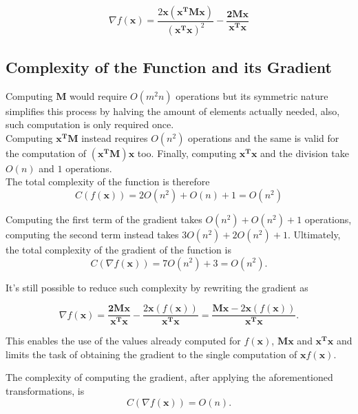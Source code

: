 \documentclass{article}
\numberwithin{equation}{section}
\begin{document}
\begin{equation}
    \nabla f(\boldsymbol{x})= \frac{2 \boldsymbol{x}( \boldsymbol{x^T M x})}{(\boldsymbol{x^Tx})^2} - \frac{ \boldsymbol{2Mx}}{ \boldsymbol{x^Tx}}
\end{equation}

\subsection{Complexity of the Function and its Gradient}

Computing $\boldsymbol{M}$ would require $O(m^2n)$ operations but its symmetric nature simplifies this process by halving the amount of elements actually needed, also, such computation is only required once. \\

Computing $\boldsymbol{x^TM}$ instead requires $O(n^2)$ operations and the same is valid for the computation of $(\boldsymbol{x^TM})\boldsymbol{x}$ too. Finally, computing $\boldsymbol{x^T}\boldsymbol{x}$ and the division take $O(n)$ and $1$ operations. \\The total complexity of the function is therefore
\begin{equation}
    C(f(\boldsymbol{x}))=2 O(n^2)+O(n)+1=O(n^2)
\end{equation}

Computing the first term of the gradient takes $O(n^2) + O(n^2) + 1$ operations, computing the second term instead takes $3 O(n^2) + 2 O(n^2) + 1$. Ultimately, the total complexity of the gradient of the function is
\begin{equation}
    C(\nabla f(\boldsymbol{x}))=7 O(n^2)+3 = O(n^2).
\end{equation}

It's still possible to reduce such complexity by rewriting the gradient as

\begin{equation}
    \nabla f(\boldsymbol{x})= \frac{ \boldsymbol{2Mx}}{ \boldsymbol{x^Tx}} - \frac{2 \boldsymbol{x}(f(\boldsymbol{x}))}{\boldsymbol{x^Tx}}=\frac{ \boldsymbol{Mx} - 2 \boldsymbol{x}(f(\boldsymbol{x}))}{ \boldsymbol{x^Tx}}.
\end{equation}

This enables the use of the values already computed for $f(\boldsymbol{x})$, $\boldsymbol{Mx}$ and $\boldsymbol{x^Tx}$ and limits the task of obtaining the gradient to the single computation of $\boldsymbol{x}f(\boldsymbol{x})$.

The complexity of computing the gradient, after applying the aforementioned transformations, is
\begin{equation}
    C(\nabla f(\boldsymbol{x}))=O(n).
\end{equation}
\end{document}
